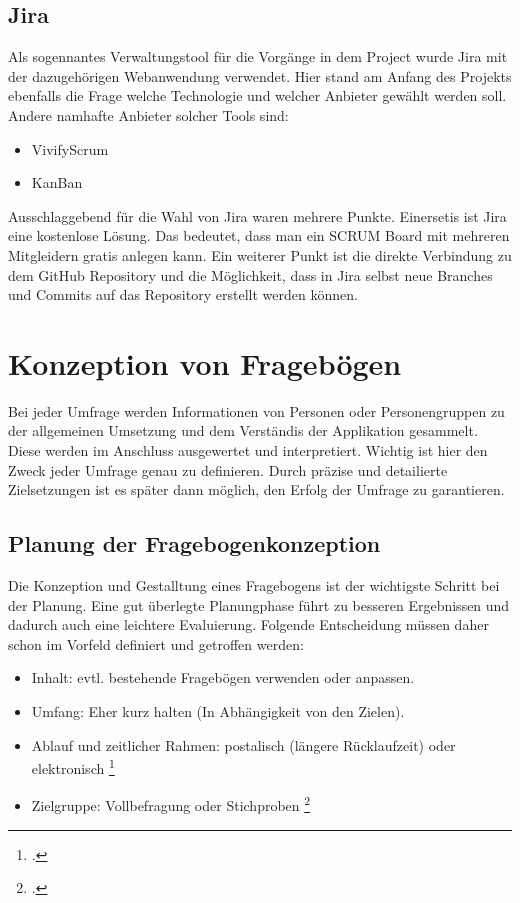 \subsection{Jira}
Als sogennantes Verwaltungstool für die Vorgänge in dem Project wurde Jira mit der dazugehörigen
Webanwendung verwendet. Hier stand am Anfang des Projekts ebenfalls die Frage welche Technologie
und welcher Anbieter gewählt werden soll. Andere namhafte Anbieter solcher Tools sind:
\begin{itemize}
    \item VivifyScrum
    \item KanBan
\end{itemize}
Ausschlaggebend für die Wahl von Jira waren mehrere Punkte. Einersetis ist Jira eine kostenlose
Lösung. Das bedeutet, dass man ein SCRUM Board mit mehreren Mitgleidern gratis anlegen kann.
Ein weiterer Punkt ist die direkte Verbindung zu dem GitHub Repository und die Möglichkeit,
dass in Jira selbst neue Branches und Commits auf das Repository erstellt werden können.

\section{Konzeption von Fragebögen}
Bei jeder Umfrage werden Informationen von Personen oder Personengruppen zu der allgemeinen
Umsetzung und dem Verständis der Applikation gesammelt. Diese werden im Anschluss ausgewertet und
interpretiert. Wichtig ist hier den Zweck jeder Umfrage genau zu definieren. Durch präzise und
detailierte Zielsetzungen ist es später dann möglich, den Erfolg der Umfrage zu garantieren.

\subsection{Planung der Fragebogenkonzeption}
Die Konzeption und Gestalltung eines Fragebogens ist der wichtigste Schritt bei der Planung.
Eine gut überlegte Planungphase führt zu besseren Ergebnissen und dadurch auch eine leichtere
Evaluierung. Folgende Entscheidung müssen daher schon im Vorfeld definiert und getroffen werden:
\begin{itemize}
    \item Inhalt: evtl. bestehende Fragebögen verwenden oder anpassen.
    \item Umfang: Eher kurz halten (In Abhängigkeit von den Zielen).
    \item Ablauf und zeitlicher Rahmen: postalisch (längere Rücklaufzeit) oder elektronisch \footcite[Vgl.][url]{Einfuehrung in die Test- und Fragebogenkonstruktion}
    \item Zielgruppe: Vollbefragung oder Stichproben \footcite{Interview und schriftliche Befragung}
\end{itemize}

